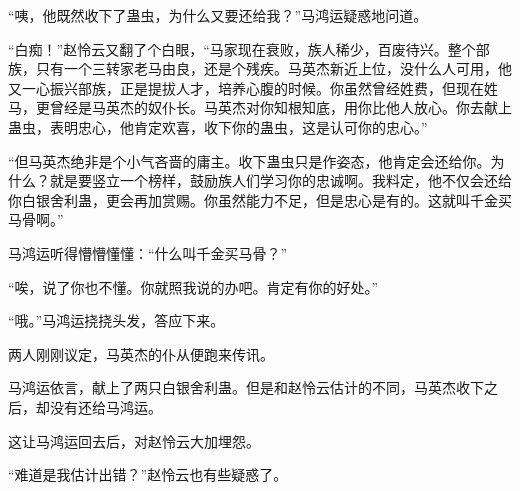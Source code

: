 \begin{this_body}
“咦，他既然收下了蛊虫，为什么又要还给我？”马鸿运疑惑地问道。

“白痴！”赵怜云又翻了个白眼，“马家现在衰败，族人稀少，百废待兴。整个部族，只有一个三转家老马由良，还是个残疾。马英杰新近上位，没什么人可用，他又一心振兴部族，正是提拔人才，培养心腹的时候。你虽然曾经姓费，但现在姓马，更曾经是马英杰的奴仆长。马英杰对你知根知底，用你比他人放心。你去献上蛊虫，表明忠心，他肯定欢喜，收下你的蛊虫，这是认可你的忠心。”

“但马英杰绝非是个小气吝啬的庸主。收下蛊虫只是作姿态，他肯定会还给你。为什么？就是要竖立一个榜样，鼓励族人们学习你的忠诚啊。我料定，他不仅会还给你白银舍利蛊，更会再加赏赐。你虽然能力不足，但是忠心是有的。这就叫千金买马骨啊。”

马鸿运听得懵懵懂懂：“什么叫千金买马骨？”

“唉，说了你也不懂。你就照我说的办吧。肯定有你的好处。”

“哦。”马鸿运挠挠头发，答应下来。

两人刚刚议定，马英杰的仆从便跑来传讯。

马鸿运依言，献上了两只白银舍利蛊。但是和赵怜云估计的不同，马英杰收下之后，却没有还给马鸿运。

这让马鸿运回去后，对赵怜云大加埋怨。

“难道是我估计出错？”赵怜云也有些疑惑了。

\end{this_body}

